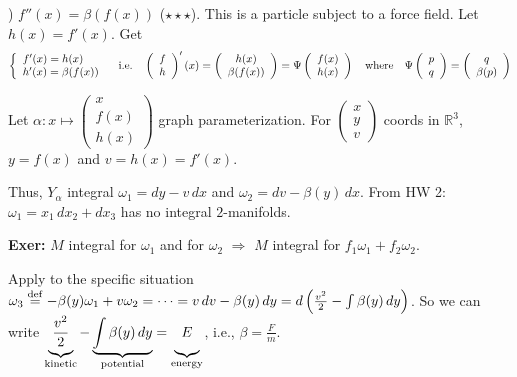 \documentclass[10pt,letterpaper]{article}
\newcommand{\n}{\hfill\break}
\newcommand{\up}{\vspace{-\baselineskip}}
\newcommand{\exer}[1]{\par\noindent\settowidth{\hangindent}{\textbf{Exer: }}\textbf{Exer: }#1\n}
\newcommand{\ptxt}[1]{\textrm{\textnormal{#1}}}
\newcommand{\reals}{\mathbb{R}}
\newcommand{\R}{\reals}
\newcommand{\eqdef}{\overset{\ptxt{def}}{=}}
\newcommand{\paren}[1]{\left(#1\right)}
\begin{document}
\par{}) $f''(x)=\beta(f(x))$ ($\star\star\star$). This is a particle subject to a force field.\n
Let $h(x)=f'(x)$. Get\up
\[
\left\{\begin{array}{l}f'(x)=h(x)\\ h'(x)=\beta(f(x))\end{array}\right.\quad\ptxt{i.e.}\quad\paren{\begin{array}{c}f\\ h\end{array}}'(x)=\paren{\begin{array}{c}h(x)\\ \beta(f(x))\end{array}}=\Psi\paren{\begin{array}{c}f(x)\\ h(x)\end{array}}\quad\ptxt{where}\quad\Psi\paren{\begin{array}{c}p\\ q\end{array}}=\paren{\begin{array}{c}q\\ \beta(p)\end{array}}
\]

\par\noindent Let $\displaystyle\alpha:x\mapsto\paren{\begin{array}{c}x\\ f(x)\\ h(x)\end{array}}$ graph parameterization. For $\paren{\begin{array}{c}x\\ y\\ v\end{array}}$ coords in $\R^{3}$,\n
$y=f(x)$ and $v=h(x)=f'(x)$.\n

\par\noindent Thus, $Y_{\alpha}$ integral $\omega_{1}=dy-v\,dx$ and $\omega_{2}=dv-\beta(y)\,dx$.\n
From HW 2: $\omega_{1}=x_{1}\,dx_{2}+dx_{3}$ has no integral $2$-manifolds.\n

\exer{$M$ integral for $\omega_{1}$ and for $\omega_{2}$ $\Rightarrow$ $M$ integral for $f_{1}\omega_{1}+f_{2}\omega_{2}$.}

\par\noindent Apply to the specific situation $\omega_{3}\eqdef-\beta(y)\omega_{1}+v\omega_{2}=\cdots=v\,dv-\beta(y)\,dy=d\paren{\frac{v^{2}}{2}-\int\beta(y)\,dy}$.\n
So we can write $\underbrace{\vphantom{\int}\frac{v^{2}}{2}}_{\ptxt{kinetic}}-\underbrace{\int\beta(y)\,dy}_{\ptxt{potential}}=\underbrace{\vphantom{\int}E}_{\ptxt{energy}}$, i.e., $\beta=\frac{F}{m}$.\n
\end{document}

